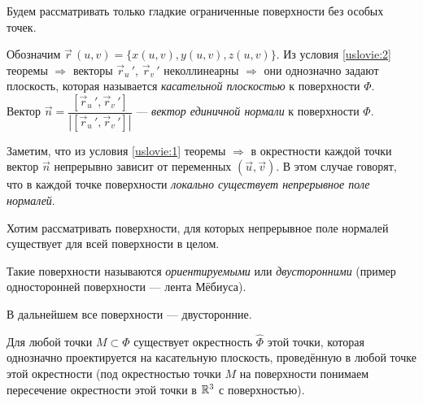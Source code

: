 \documentclass[a4paper,10pt]{article}
\begin{document}
	Будем рассматривать только гладкие ограниченные поверхности без особых точек.
	
	\begin{defn}
		Обозначим $\vec{r}\,(u, v) = \{x(u, v), y(u, v), z(u, v)\}$. Из условия \ref{uslovie:2} теоремы $\Rightarrow$ векторы $\vec{r}_u\,\!\!\!'$, $\vec{r}_v\,\!\!\!'$ неколлинеарны $\Rightarrow$ они однозначно задают плоскость, которая называется \textit{касательной плоскостью} к поверхности $\Phi$. \\
		Вектор $\vec{n} = \dfrac{[\vec{r}_u\,\!\!\!', \vec{r}_v\,\!\!\!']}{|[\vec{r}_u\,\!\!\!', \vec{r}_v\,\!\!\!']|}$ --- \textit{вектор единичной нормали} к поверхности $\Phi$.
	\end{defn}
	
	Заметим, что из условия \ref{uslovie:1} теоремы $\Rightarrow$ в окрестности каждой точки вектор $\vec{n}$ непрерывно зависит от переменных $(\vec{u}, \vec{v})$. В этом случае говорят, что в каждой точке поверхности \textit{локально существует непрерывное поле нормалей}.
	
	Хотим рассматривать поверхности, для которых непрерывное поле нормалей существует для всей поверхности в целом.
	
	Такие поверхности называются \textit{ориентируемыми} или \textit{двусторонними} (пример односторонней поверхности --- лента Мёбиуса).
	
	В дальнейшем все поверхности --- двусторонние.
	
	\begin{lem}
		Для любой точки $M \subset \Phi$ существует окрестность $\widehat{\Phi}$ этой точки, которая однозначно проектируется на касательную плоскость, проведённую в любой точке этой окрестности (под окрестностью точки $M$ на поверхности понимаем пересечение окрестности этой точки в ${\mathbb R}^3$ с поверхностью).
	\end{lem}
	
\end{document}
